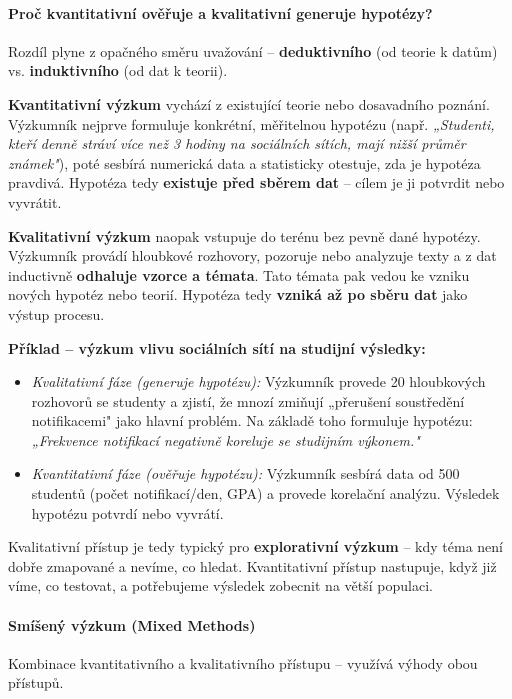 \paragraph{Proč kvantitativní ověřuje a kvalitativní generuje hypotézy?}

Rozdíl plyne z opačného směru uvažování -- \textbf{deduktivního} (od teorie k datům) vs. \textbf{induktivního} (od dat k teorii).

\textbf{Kvantitativní výzkum} vychází z existující teorie nebo dosavadního poznání. Výzkumník nejprve formuluje konkrétní, měřitelnou hypotézu (např. \textit{„Studenti, kteří denně stráví více než 3 hodiny na sociálních sítích, mají nižší průměr známek"}), poté sesbírá numerická data a statisticky otestuje, zda je hypotéza pravdivá. Hypotéza tedy \textbf{existuje před sběrem dat} -- cílem je ji potvrdit nebo vyvrátit.

\textbf{Kvalitativní výzkum} naopak vstupuje do terénu bez pevně dané hypotézy. Výzkumník provádí hloubkové rozhovory, pozoruje nebo analyzuje texty a z dat inductivně \textbf{odhaluje vzorce a témata}. Tato témata pak vedou ke vzniku nových hypotéz nebo teorií. Hypotéza tedy \textbf{vzniká až po sběru dat} jako výstup procesu.

\textbf{Příklad -- výzkum vlivu sociálních sítí na studijní výsledky:}
\begin{itemize}
  \item \textit{Kvalitativní fáze (generuje hypotézu):} Výzkumník provede 20 hloubkových rozhovorů se studenty a zjistí, že mnozí zmiňují „přerušení soustředění notifikacemi" jako hlavní problém. Na základě toho formuluje hypotézu: \textit{„Frekvence notifikací negativně koreluje se studijním výkonem."}
  \item \textit{Kvantitativní fáze (ověřuje hypotézu):} Výzkumník sesbírá data od 500 studentů (počet notifikací/den, GPA) a provede korelační analýzu. Výsledek hypotézu potvrdí nebo vyvrátí.
\end{itemize}

Kvalitativní přístup je tedy typický pro \textbf{explorativní výzkum} -- kdy téma není dobře zmapované a nevíme, co hledat. Kvantitativní přístup nastupuje, když již víme, co testovat, a potřebujeme výsledek zobecnit na větší populaci.

\paragraph{Smíšený výzkum (Mixed Methods)}
Kombinace kvantitativního a kvalitativního přístupu -- využívá výhody obou přístupů.


